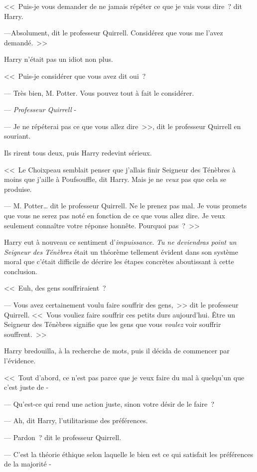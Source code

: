 <<~Puis-je vous demander de ne jamais répéter ce que je vais vous dire~? dit Harry.

---Absolument, dit le professeur Quirrell. Considérez que vous me l'avez demandé.~>>

Harry n'était pas un idiot non plus.

<<~Puis-je considérer que vous avez dit oui~?

--- Très bien, M. Potter. Vous pouvez tout à fait le considérer.

--- \emph{Professeur Quirrell} -

--- Je ne répéterai pas ce que vous allez dire~>>, dit le professeur Quirrell en souriant.

Ils rirent tous deux, puis Harry redevint sérieux.

<<~Le Choixpeau semblait penser que j'allais finir Seigneur des Ténèbres à moins que j'aille à Poufsouffle, dit Harry. Mais je ne \emph{veux} pas que cela se produise.

--- M. Potter… dit le professeur Quirrell. Ne le prenez pas mal. Je vous promets que vous ne serez pas noté en fonction de ce que vous allez dire. Je veux seulement connaître votre réponse honnête. Pourquoi pas~?~>>

Harry eut à nouveau ce sentiment d'\emph{impuissance}. \emph{Tu ne deviendras point un Seigneur des Ténèbres} était un théorème tellement évident dans son système moral que c'était difficile de décrire les étapes concrètes aboutissant à cette conclusion.

<<~Euh, des gens souffriraient~?

--- Vous avez certainement voulu faire souffrir des gens,~>> dit le professeur Quirrell. <<~Vous vouliez faire souffrir ces petits durs aujourd'hui. Être un Seigneur des Ténèbres signifie que les gens que vous \emph{voulez} voir souffrir souffrent.~>>

Harry bredouilla, à la recherche de mots, puis il décida de commencer par l'évidence.

<<~Tout d'abord, ce n'est pas parce que je veux faire du mal à quelqu'un que c'est juste de -

--- Qu'est-ce qui rend une action juste, sinon votre désir de le faire~?

--- Ah, dit Harry, l'utilitarisme des préférences.

--- Pardon~? dit le professeur Quirrell.

--- C'est la théorie éthique selon laquelle le bien est ce qui satisfait les préférences de la majorité -

